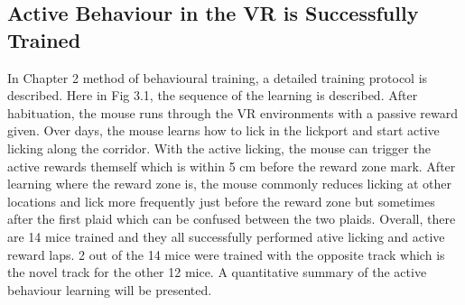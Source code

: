 \subsection{Active Behaviour in the VR is Successfully Trained}


In Chapter 2 method of behavioural training, a detailed training protocol is described. Here in Fig 3.1, the sequence of the learning is described. After habituation, the mouse runs through the VR environments with a passive reward given. Over days, the mouse learns how to lick in the lickport and start active licking along the corridor. With the active licking, the mouse can trigger the active rewards themself which is within 5 cm before the reward zone mark. After learning where the reward zone is, the mouse commonly reduces licking at other locations and lick more frequently just before the reward zone but sometimes after the first plaid which can be confused between the two plaids. Overall, there are 14 mice trained and they all successfully performed ative licking and active reward laps. 2 out of the 14 mice were trained with the opposite track which is the novel track for the other 12 mice. A quantitative summary of the active behaviour learning will be presented.

